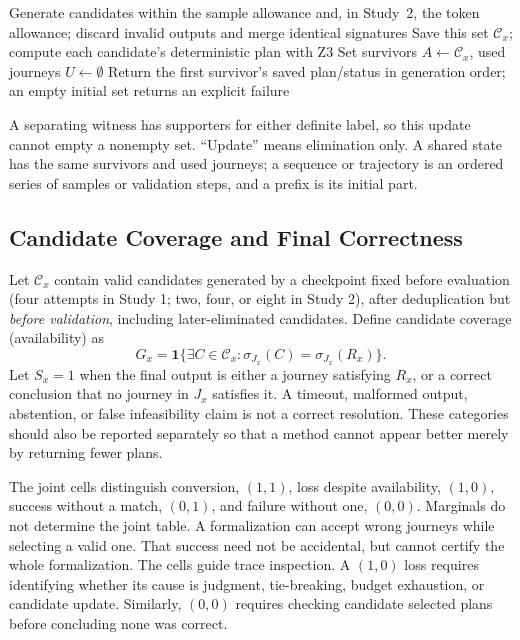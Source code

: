 \documentclass[a4paper,twoside]{article}
\begin{document}
\begin{algorithm}[ht]
\caption{Evaluated pipeline (no candidate repair)}
\label{alg:pipeline}
Generate candidates within the sample allowance and, in Study~2, the token allowance; discard invalid outputs and merge identical signatures\;
Save this set $\mathcal C_x$; compute each candidate's deterministic plan with Z3\;
Set survivors $A\leftarrow\mathcal C_x$, used journeys $U\leftarrow\emptyset$\;
Return the first survivor's saved plan/status in generation order; an empty initial set returns an explicit failure\;
\end{algorithm}
A separating witness has supporters for either definite label, so this update cannot empty a nonempty set. ``Update'' means elimination only. A shared state has the same survivors and used journeys; a sequence or trajectory is an ordered series of samples or validation steps, and a prefix is its initial part.



\subsection{Candidate Coverage and Final Correctness}

Let $\mathcal C_x$ contain valid candidates generated by a checkpoint fixed before evaluation (four attempts in Study 1; two, four, or eight in Study 2), after deduplication but \emph{before validation}, including later-eliminated candidates. Define candidate coverage (availability) as
\begin{equation}
 G_x=\mathbf{1}\{\exists C\in\mathcal{C}_x:
                 \sigma_{J_x}(C)=\sigma_{J_x}(R_x)\}.
\end{equation}
Let $S_x=1$ when the final output is either a journey satisfying $R_x$, or a correct conclusion that no journey in $J_x$ satisfies it. A timeout, malformed output, abstention, or false infeasibility claim is not a correct resolution. These categories should also be reported separately so that a method cannot appear better merely by returning fewer plans.

The joint cells distinguish conversion, $(1,1)$, loss despite availability, $(1,0)$, success without a match, $(0,1)$, and failure without one, $(0,0)$. Marginals do not determine the joint table. A formalization can accept wrong journeys while selecting a valid one. That success need not be accidental, but cannot certify the whole formalization.
The cells guide trace inspection. A $(1,0)$ loss requires identifying whether its cause is judgment, tie-breaking, budget exhaustion, or candidate update. Similarly, $(0,0)$ requires checking candidate selected plans before concluding none was correct.
\end{document}
